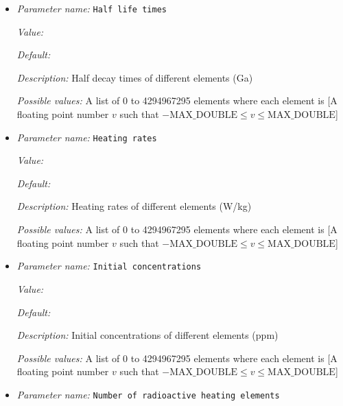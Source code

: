 \begin{itemize}
\item {\it Parameter name:} {\tt Half life times}
\label{parameters:Boundary temperature model/Dynamic core/Radioactive heat source/Half life times}
\label{parameters:Boundary_20temperature_20model/Dynamic_20core/Radioactive_20heat_20source/Half_20life_20times}


{\it Value:} 


{\it Default:} 


{\it Description:} Half decay times of different elements (Ga)


{\it Possible values:} A list of 0 to 4294967295 elements where each element is [A floating point number $v$ such that $-\text{MAX\_DOUBLE} \leq v \leq \text{MAX\_DOUBLE}$]
\item {\it Parameter name:} {\tt Heating rates}
\label{parameters:Boundary temperature model/Dynamic core/Radioactive heat source/Heating rates}
\label{parameters:Boundary_20temperature_20model/Dynamic_20core/Radioactive_20heat_20source/Heating_20rates}


{\it Value:} 


{\it Default:} 


{\it Description:} Heating rates of different elements (W/kg)


{\it Possible values:} A list of 0 to 4294967295 elements where each element is [A floating point number $v$ such that $-\text{MAX\_DOUBLE} \leq v \leq \text{MAX\_DOUBLE}$]
\item {\it Parameter name:} {\tt Initial concentrations}
\label{parameters:Boundary temperature model/Dynamic core/Radioactive heat source/Initial concentrations}
\label{parameters:Boundary_20temperature_20model/Dynamic_20core/Radioactive_20heat_20source/Initial_20concentrations}


{\it Value:} 


{\it Default:} 


{\it Description:} Initial concentrations of different elements (ppm)


{\it Possible values:} A list of 0 to 4294967295 elements where each element is [A floating point number $v$ such that $-\text{MAX\_DOUBLE} \leq v \leq \text{MAX\_DOUBLE}$]
\item {\it Parameter name:} {\tt Number of radioactive heating elements}
\label{parameters:Boundary temperature model/Dynamic core/Radioactive heat source/Number of radioactive heating elements}
\label{parameters:Boundary_20temperature_20model/Dynamic_20core/Radioactive_20heat_20source/Number_20of_20radioactive_20heating_20elements}



\end{itemize}
